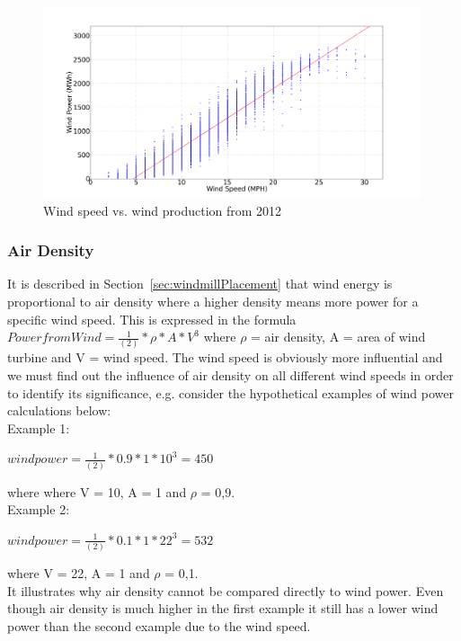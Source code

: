 \begin{figure}[h!]
\centering
\includegraphics[width=0.99\textwidth]{billeder/WindSpeedVsProduction.png}
\caption{Wind speed vs. wind production from 2012}
\label{fig:windVsProd}
\end{figure}

\subsubsection{Air Density}
\label{sec:airDensity}
It is described in Section~\ref{sec:windmillPlacement} that wind energy is proportional to air density where a higher density means more power for a specific wind speed. This is expressed in the formula $Power from Wind=\frac{1}{(2)}*\rho*A*V^3$ where $\rho$ = air density, A = area of wind turbine and V = wind speed. The wind speed is obviously more influential and we must find out the influence of air density on all different wind speeds in order to identify its significance, e.g. consider the hypothetical examples of wind power calculations below:
\\[0.5cm]
\noindent Example 1:

\begin{center}
$wind power = \frac{1}{(2)}*0.9*1*10^3 = 450$
\end{center}

\noindent where where V = 10, A = 1 and $\rho$ =  0,9.
\\[0.5cm]
\noindent Example 2: 

\begin{center}
$wind power = \frac{1}{(2)}*0.1*1*22^3 = 532$
\end{center}

\noindent where V = 22, A = 1 and $\rho$ =  0,1.
\\[0.5cm]
\noindent It illustrates why air density cannot be compared directly to wind power. Even though air density is much higher in the first example it still has a lower wind power than the second example due to the wind speed.

